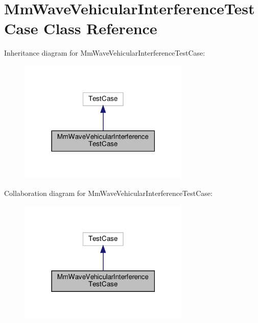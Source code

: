 \hypertarget{classMmWaveVehicularInterferenceTestCase}{}\section{Mm\+Wave\+Vehicular\+Interference\+Test\+Case Class Reference}
\label{classMmWaveVehicularInterferenceTestCase}


Inheritance diagram for Mm\+Wave\+Vehicular\+Interference\+Test\+Case\+:
\nopagebreak
\begin{figure}[H]
\begin{center}
\leavevmode
\includegraphics[width=231pt]{classMmWaveVehicularInterferenceTestCase__inherit__graph}
\end{center}
\end{figure}


Collaboration diagram for Mm\+Wave\+Vehicular\+Interference\+Test\+Case\+:
\nopagebreak
\begin{figure}[H]
\begin{center}
\leavevmode
\includegraphics[width=231pt]{classMmWaveVehicularInterferenceTestCase__coll__graph}
\end{center}
\end{figure}
